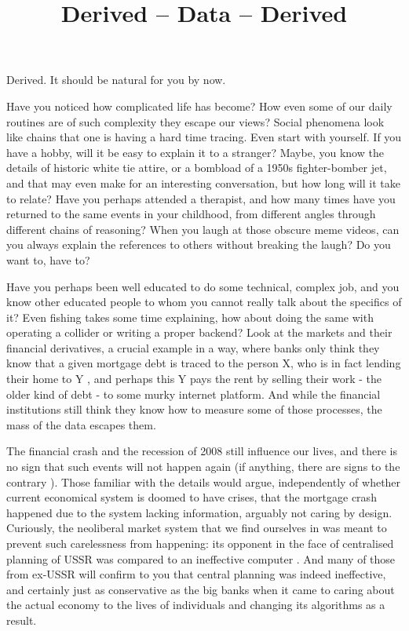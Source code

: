 \documentclass{article}
\title{Derived -- Data -- Derived}
\author{}
\begin{document}
\thispagestyle{empty}

\maketitle

\noindent Derived. It should be natural for you by now.




Have you noticed how complicated life has become? How even some of our daily routines are of such complexity they escape our views? Social phenomena look like chains that one is having a hard time tracing. Even start with yourself. If you have a hobby, will it be easy to explain it to a stranger? Maybe, you know the details of historic white tie attire, or a bombload of a 1950s fighter-bomber jet, and that may even make for an interesting conversation, but how long will it take to relate? Have you perhaps attended a therapist, and how many times have you returned to the same events in your childhood, from different angles through different chains of reasoning?
When you laugh at those obscure meme videos, can you always explain the references to others without breaking the laugh? Do you want to, have to?


Have you perhaps been well educated to do some technical, complex job, and you know other educated people to whom you cannot really talk about the specifics of it? Even fishing takes some time explaining, how about doing the same with operating a collider or writing a proper backend? Look at the markets and their financial derivatives, a crucial example in a way, where banks only think they know that a given mortgage debt is traced to the person X, who is in fact lending their home to Y \cite{BGSHT}, and perhaps this Y pays the rent by selling their work - the older kind of debt - to some murky internet platform. And while the financial institutions still think they know how to measure some of those processes, the mass of the data escapes them.

The financial crash and the recession of 2008 still influence our lives, and there is no sign that such events will not
happen again (if anything, there are signs to the contrary \cite{FORBES}). Those familiar with the details
\cite{BGSHT} would argue, independently of whether current economical system is doomed to have crises,
that the mortgage crash happened due to the system lacking information, arguably not caring by design.
Curiously, the neoliberal market system that we find ourselves in was meant to prevent such carelessness
from happening: its opponent in the face of centralised planning of USSR was compared to an ineffective computer \cite{DWIT}.
And many of those from ex-USSR will confirm to you that central planning was indeed ineffective,
and certainly just as conservative as the big banks when it came to caring about the actual economy to the
lives of individuals and changing its algorithms as a result.
\end{document}
